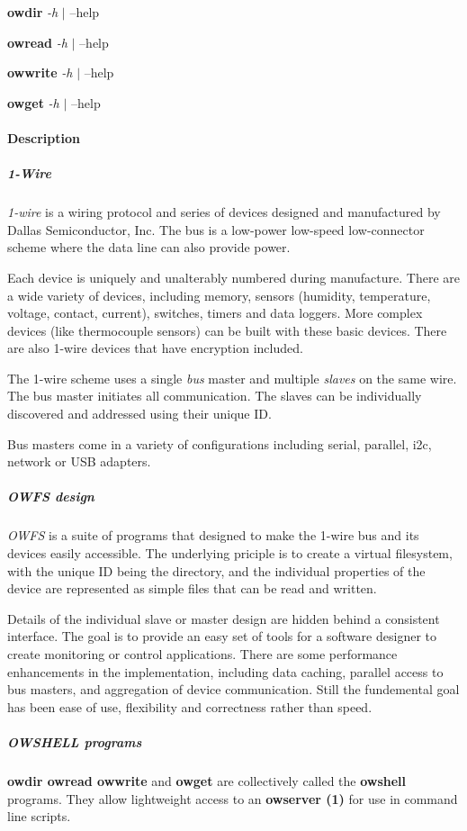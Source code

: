 \textbf{owdir} \textit{-h} $|$ --help 

\textbf{owread} \textit{-h} $|$ --help 

\textbf{owwrite} \textit{-h} $|$ --help 

\textbf{owget} \textit{-h} $|$ --help 


\paragraph*{Description}
          
\subparagraph*{1-Wire}\textit{1-wire}  is a wiring protocol and series of devices
designed and manufactured by Dallas Semiconductor, Inc. The bus is a low-power
low-speed low-connector scheme where the data line can also provide power.


Each device is uniquely and unalterably numbered during manufacture. There
are a wide variety of devices, including memory, sensors (humidity, temperature,
voltage, contact, current), switches, timers and data loggers. More complex
devices (like thermocouple sensors) can be built with these basic devices.
There are also 1-wire devices that have encryption included. 

The 1-wire scheme
uses a single  \textit{bus} master and multiple \textit{slaves} on the same wire. The bus
master initiates all communication. The slaves can be  individually discovered
and addressed using their unique ID. 

Bus masters come in a variety of configurations
including serial, parallel, i2c, network or USB adapters. 
\subparagraph*{OWFS design}\textit{OWFS}
is a suite of programs that designed to make the 1-wire bus and its devices
easily accessible. The underlying priciple is to create a virtual filesystem,
with the unique ID being the directory, and the individual properties of
the device are represented as simple files that can be read and written.


Details of the individual slave or master design are hidden behind a consistent
interface. The goal is to  provide an easy set of tools for a software designer
to create monitoring or control applications. There  are some performance
enhancements in the implementation, including data caching, parallel access
to bus  masters, and aggregation of device communication. Still the fundemental
goal has been ease of use, flexibility  and correctness rather than speed.
 
\subparagraph*{OWSHELL programs}\textbf{owdir owread owwrite } and  \textbf{owget} are collectively called
the \textbf{owshell} programs. They allow lightweight access to an \textsf{\textbf{owserver (1)}} for
use in command line scripts. 

